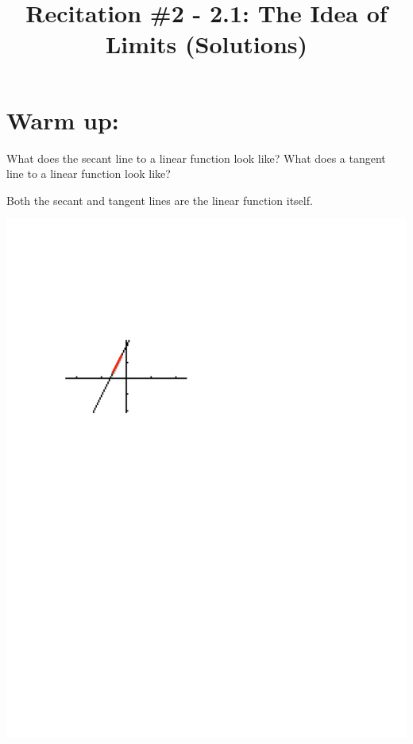 \documentclass[nooutcomes]{ximera}
\title{Recitation \#2 - 2.1:  The Idea of Limits (Solutions)}
\begin{document}
\begin{abstract}		\end{abstract}
\maketitle

\section*{Warm up:}

  What does the secant line to a linear function look like?  What does a tangent line to a linear function look like? 
  	 \begin{freeResponse}		 
	Both the secant and tangent lines are the linear function itself.
	\begin{image}
	\includegraphics[trim= 90 480 300 160]{Figure8.pdf}
	\end{image}
	\end{freeResponse}
\end{document}
